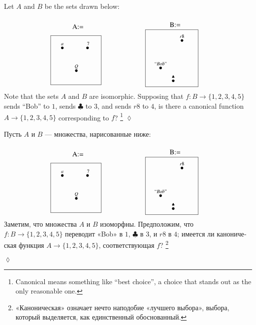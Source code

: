 \documentclass{book}
\newcommand{\boxtitle}[1]{\begin{center}#1\end{center}\vspace{-.1in}}
\def\to{\rightarrow}
\def\taking{\colon}
\newcommand{\LMO}[1]{\stackrel{#1}{\bullet}}
\theoremstyle{theoremENG}
\theoremstyle{lemmaENG}
\theoremstyle{propositionENG}
\theoremstyle{corollaryENG}
\theoremstyle{factENG}
\theoremstyle{remarkENG}
\theoremstyle{exampleENG}
\theoremstyle{warningENG}
\theoremstyle{questionENG}
\theoremstyle{guessENG}
\theoremstyle{answerENG}
\theoremstyle{constructionENG}
\theoremstyle{rulesENG}
\theoremstyle{excENG}
\newtheorem{excENG}[subsubsection]{\begin{english}Exercise\end{english}}
\theoremstyle{appENG}
\theoremstyle{definitionENG}
\theoremstyle{notationENG}
\theoremstyle{conjectureENG}
\theoremstyle{postulateENG}
\newenvironment{exerciseENG}{\begin{excENG}}{\hspace*{\fill}$\lozenge$\end{excENG}}
\theoremstyle{theoremRUS}
\theoremstyle{lemmaRUS}
\theoremstyle{propositionRUS}
\theoremstyle{corollaryRUS}
\theoremstyle{factRUS}
\theoremstyle{remarkRUS}
\theoremstyle{exampleRUS}
\theoremstyle{warningRUS}
\theoremstyle{questionRUS}
\theoremstyle{guessRUS}
\theoremstyle{answerRUS}
\theoremstyle{constructionRUS}
\theoremstyle{rulesRUS}
\theoremstyle{excRUS}
\newtheorem{excRUS}[subsubsection]{\begin{russian}Упражнение\end{russian}}
\theoremstyle{appRUS}
\theoremstyle{definitionRUS}
\theoremstyle{notationRUS}
\theoremstyle{conjectureRUS}
\theoremstyle{postulateRUS}
\newenvironment{exerciseRUS}{\begin{excRUS}}{\hspace*{\fill}$\lozenge$\end{excRUS}}
\begin{document}
\begin{english}
\begin{exerciseENG}\label{exc:functions are not iso invariant}
Let $A$ and $B$ be the sets drawn below:
$$
\parbox{1.1in}{\boxtitle{A:=}\fbox{\xymatrix@=1pt{\\&\LMO{\;a\;}&&&\LMO{\;\;\;7\;\;}&\\\\\\&&&\LMO{Q}\\&}}}
\hspace{.8in}
\parbox{1.2in}{\boxtitle{B:=}\fbox{\xymatrix@=1pt{&&&\LMO{r8}&&\\\\\\\\&\LMO{``Bob"}\\&&\LMO{\clubsuit}}}}
$$
Note that the sets $A$ and $B$ are isomorphic. Supposing that $f\taking B\to\{1,2,3,4,5\}$ sends “Bob” to $1$, sends $\clubsuit$ to $3$, and sends $r8$ to $4$, is there a canonical function $A\to\{1,2,3,4,5\}$ corresponding to $f$?
\footnote{Canonical means something like “best choice”, a choice that stands out as the only reasonable one.}
\end{exerciseENG}

\begin{exerciseRUS}\label{exc:functions are not iso invariant}
\begin{russian}Пусть $A$ и $B$ — множества, нарисованные ниже:
$$
\parbox{1.1in}{\boxtitle{A:=}\fbox{\xymatrix@=1pt{\\&\LMO{\;a\;}&&&\LMO{\;\;\;7\;\;}&\\\\\\&&&\LMO{Q}\\&}}}
\hspace{.8in}
\parbox{1.2in}{\boxtitle{B:=}\fbox{\xymatrix@=1pt{&&&\LMO{r8}&&\\\\\\\\&\LMO{``Bob"}\\&&\LMO{\clubsuit}}}}
$$
Заметим, что множества $A$ и $B$ изоморфны. Предположим, что $f\taking B\to\{1,2,3,4,5\}$ переводит «Bob» в $1$, $\clubsuit$ в $3$, и $r8$ в $4$; имеется ли каноническая функция $A\to\{1,2,3,4,5\}$, соответствующая $f$?
\footnote{«Каноническая» означает нечто наподобие «лучшего выбора», выбора, который выделяется, как единственный обоснованный.}
\end{russian}
\end{exerciseRUS}


\end{english}
\end{document}

